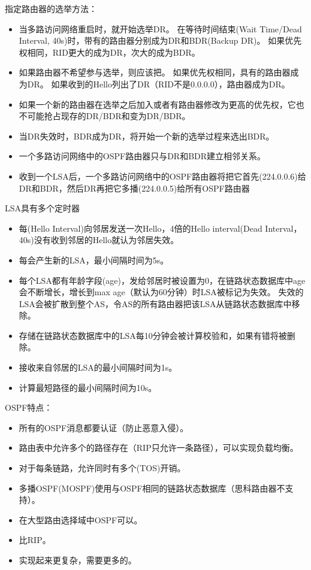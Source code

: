 \myhline
指定路由器的选举方法：
\begin{itemize}
	\item 当多路访问网络重启时，就开始选举DR。
	在等待时间结束(Wait Time/Dead Interval, 40s)时，带有的路由器分别成为DR和BDR(Backup DR)。
	如果优先权相同，RID更大的成为DR，次大的成为BDR。
	\item 如果路由器不希望参与选举，则应该把。
	如果优先权相同，具有的路由器成为DR。
	如果收到的Hello列出了DR（RID不是0.0.0.0），路由器成为DR。
	\item 如果一个新的路由器在选举之后加入或者有路由器修改为更高的优先权，它也不可能抢占现存的DR/BDR和变为DR/BDR。
	\item 当DR失效时，BDR成为DR，将开始一个新的选举过程来选出BDR。
	\item 一个多路访问网络中的OSPF路由器只与DR和BDR建立相邻关系。
	\item 收到一个LSA后，一个多路访问网络中的OSPF路由器将把它首先(224.0.0.6)给DR和BDR，然后DR再把它多播(224.0.0.5)给所有OSPF路由器
\end{itemize}

\myhline
LSA具有多个定时器
\begin{itemize}
	\item 每(Hello Interval)向邻居发送一次Hello，4倍的Hello interval(Dead Interval，40s)没有收到邻居的Hello就认为邻居失效。
	\item 每会产生新的LSA，最小间隔时间为5s。
	\item 每个LSA都有年龄字段(age)，发给邻居时被设置为0，在链路状态数据库中age会不断增长，增长到max age（默认为60分钟）时LSA被标记为失效。
	失效的LSA会被扩散到整个AS，令AS的所有路由器把该LSA从链路状态数据库中移除。
	\item 存储在链路状态数据库中的LSA每10分钟会被计算校验和，如果有错将被删除。
	\item 接收来自邻居的LSA的最小间隔时间为1s。
	\item 计算最短路径的最小间隔时间为10s。
\end{itemize}

\myhline
OSPF特点：
\begin{itemize}
	\item 所有的OSPF消息都要认证（防止恶意入侵）。
	\item 路由表中允许多个的路径存在（RIP只允许一条路径），可以实现负载均衡。
	\item 对于每条链路，允许同时有多个(TOS)开销。
	\item 多播OSPF(MOSPF)使用与OSPF相同的链路状态数据库（思科路由器不支持）。
	\item 在大型路由选择域中OSPF可以。
	\item 比RIP。
	\item 实现起来更复杂，需要更多的。
\end{itemize}

